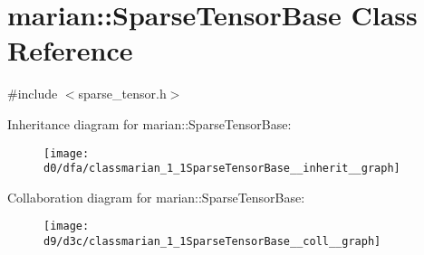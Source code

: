 \hypertarget{classmarian_1_1SparseTensorBase}{}\section{marian\+:\+:Sparse\+Tensor\+Base Class Reference}
\label{classmarian_1_1SparseTensorBase}


{\ttfamily \#include $<$sparse\+\_\+tensor.\+h$>$}



Inheritance diagram for marian\+:\+:Sparse\+Tensor\+Base\+:
\nopagebreak
\begin{figure}[H]
\begin{center}
\leavevmode
\texttt{[image: d0/dfa/classmarian\_1\_1SparseTensorBase\_\_inherit\_\_graph]}
\end{center}
\end{figure}


Collaboration diagram for marian\+:\+:Sparse\+Tensor\+Base\+:
\nopagebreak
\begin{figure}[H]
\begin{center}
\leavevmode
\texttt{[image: d9/d3c/classmarian\_1\_1SparseTensorBase\_\_coll\_\_graph]}
\end{center}
\end{figure}
